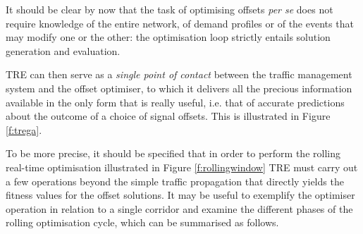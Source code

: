 It should be clear by now that the task of optimising offsets \emph{per se} does not require knowledge of the entire network, of demand profiles or of the events that may modify one or the other: the optimisation loop strictly entails solution generation and evaluation.

TRE can then serve as a \emph{single point of contact} between the traffic management system and the offset optimiser, to which it delivers all the precious information available in the only form that is really useful, i.e. that of accurate predictions about the outcome of a choice of signal offsets. This is illustrated in Figure \ref{f:trega}.


To be more precise, it should be specified that in order to perform the rolling real-time optimisation illustrated in Figure \ref{f:rollingwindow} TRE must carry out a few operations beyond the simple traffic propagation that directly yields the fitness values for the offset solutions.
It may be useful to exemplify the optimiser operation in relation to a single corridor and examine the different phases of the rolling optimisation cycle, which can be summarised as follows.
